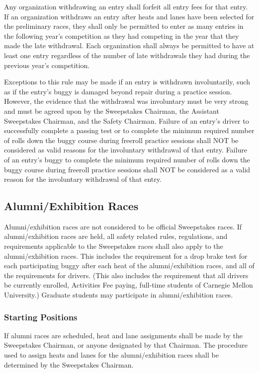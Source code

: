 	Any organization withdrawing an entry shall forfeit all entry fees for that entry. If an organization withdraws an entry after heats and lanes have been selected for the preliminary races, they shall only be permitted to enter as many entries in the following year's competition as they had competing in the year that they made the late withdrawal. Each organization shall always be permitted to have at least one entry regardless of the number of late withdrawals they had during the previous year's competition.

	Exceptions to this rule may be made if an entry is withdrawn involuntarily, such as if the entry's buggy is damaged beyond repair during a practice session. However, the evidence that the withdrawal was involuntary must be very strong and must be agreed upon by the Sweepstakes Chairman, the Assistant Sweepstakes Chairman, and the Safety Chairman. Failure of an entry's driver to successfully complete a passing test or to complete the minimum required number of rolls down the buggy course during freeroll practice sessions shall NOT be considered as valid reasons for the involuntary withdrawal of that entry. Failure of an entry's buggy to complete the minimum required number of rolls down the buggy course during freeroll practice sessions shall NOT be considered as a valid reason for the involuntary withdrawal of that entry.

\subsection{Alumni/Exhibition Races}

	Alumni/exhibition races are not considered to be official Sweepstakes races. If alumni/exhibition races are held, all safety related rules, regulations, and requirements applicable to the Sweepstakes races shall also apply to the alumni/exhibition races. This includes the requirement for a drop brake test for each participating buggy after each heat of the alumni/exhibition races, and all of the requirements for drivers. (This also includes the requirement that all drivers be currently enrolled, Activities Fee paying, full-time students of Carnegie Mellon University.) Graduate students may participate in alumni/exhibition races.

\subsubsection{Starting Positions}

	If alumni races are scheduled, heat and lane assignments shall be made by the Sweepstakes Chairman, or anyone designated by that Chairman. The procedure used to assign heats and lanes for the alumni/exhibition races shall be determined by the Sweepstakes Chairman.

